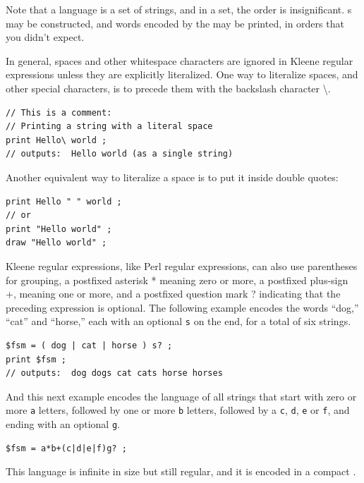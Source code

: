 \noindent
Note that a language is a set of strings, and in a set, the order is
insignificant.  \fsm{}s may be constructed, and words encoded by the \fsm{}
may be printed, in orders that you didn't expect.

In general, spaces and other whitespace characters are ignored in Kleene regular
expressions unless they are explicitly literalized.  
One way to literalize spaces, and other
special characters, is to precede them with the backslash character \textbackslash.

\begin{Verbatim}
// This is a comment:
// Printing a string with a literal space
print Hello\ world ;
// outputs:  Hello world (as a single string)
\end{Verbatim}

\noindent
Another equivalent way to literalize a space is to put it inside double quotes:

\begin{Verbatim}
print Hello " " world ;
// or
print "Hello world" ;
draw "Hello world" ;
\end{Verbatim}

Kleene regular expressions, like Perl regular expressions, can also use parentheses for
grouping, a postfixed asterisk * meaning zero or more, a postfixed plus-sign +,
meaning one or more, and a postfixed question mark ? indicating that the preceding
expression is optional.  The following example encodes the words ``dog,'' ``cat'' and
``horse,'' each with an optional \texttt{s} on the end, for a total of six strings.

\begin{Verbatim}
$fsm = ( dog | cat | horse ) s? ;
print $fsm ;
// outputs:  dog dogs cat cats horse horses
\end{Verbatim}

\noindent
And this next example encodes the language of all strings that start with zero or more
\texttt{a} letters, followed by one or more \texttt{b} letters, followed by a
\texttt{c}, \texttt{d}, \texttt{e} or \texttt{f}, and ending with an optional
\texttt{g}.

\begin{Verbatim}
$fsm = a*b+(c|d|e|f)g? ;
\end{Verbatim}

\noindent
This language is infinite in size but still regular, and it is
encoded in a compact \fsm{}.


